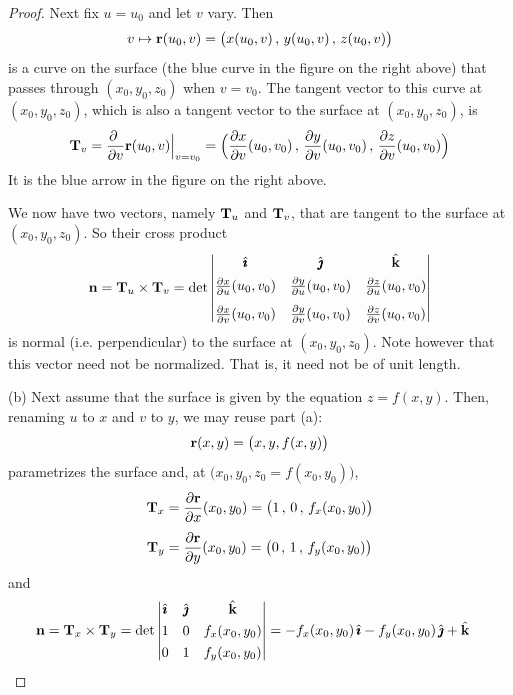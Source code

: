 \begin{proof}
Next fix $u=u_0$ and let $v$ vary. Then
\begin{equation*}
v\mapsto \mathbf{r}(u_0,v) = \big(x(u_0,v)\,,\,y(u_0,v)\,,\,z(u_0,v)\big)
\end{equation*}
is a curve on the surface (the blue curve in the figure on the right above) 
that passes through $(x_0,y_0,z_0)$ when $v=v_0$.
The tangent vector to this curve at  $(x_0,y_0,z_0)$,
which is also a tangent vector to the surface at $(x_0,y_0,z_0)$,
is
\begin{equation*}
\mathbf{T}_v = \frac{\partial\ }{\partial v}\mathbf{r}(u_0,v)\Big|_{v=v_0}
=\Big(\frac{\partial x}{\partial v}(u_0,v_0)\,,\,
      \frac{\partial y}{\partial v}(u_0,v_0)\,,\,
      \frac{\partial z}{\partial v}(u_0,v_0)\Big)
\end{equation*}
It is the blue arrow in the figure on the right above.

We now have two vectors, namely $\mathbf{T}_u$ and $\mathbf{T}_v$, that are tangent
to the surface at $(x_0,y_0,z_0)$. So their cross product
\begin{align*}
\mathbf{n} = \mathbf{T}_u\times\mathbf{T}_v
=\det\left|\begin{matrix}
            \hat{\pmb{\imath}} &  \hat{\pmb{\jmath}} & \hat{\mathbf{k}} \\[0.05in]
            \frac{\partial x}{\partial u}(u_0,v_0) &
                     \frac{\partial y}{\partial u}(u_0,v_0) &
                     \frac{\partial z}{\partial u}(u_0,v_0) \\[0.1in]
           \frac{\partial x}{\partial v}(u_0,v_0) &
                     \frac{\partial y}{\partial v}(u_0,v_0) &
                     \frac{\partial z}{\partial v}(u_0,v_0)
           \end{matrix}\right|
\end{align*}
is normal (i.e. perpendicular) to the surface at $(x_0,y_0,z_0)$.
Note however that this vector need not be normalized. That is, it need not 
be of unit length.

\bigskip
\noindent (b)
Next assume that the surface is given by the equation
$z=f(x,y)$. Then, renaming $u$ to $x$ and $v$ to $y$, we may reuse part (a):
\begin{equation*}
\mathbf{r}(x,y) = \big(x,y, f(x,y)\big)
\end{equation*}
parametrizes the surface and, at $\big(x_0,y_0,z_0=f(x_0,y_0)\big)$,
\begin{align*}
\mathbf{T}_x &= \frac{\partial\mathbf{r} }{\partial x}(x_0,y_0)
=\big(1\,,\,
      0\,,\,
      f_x(x_0,y_0)\big)
\\[0.05in]
\mathbf{T}_y &= \frac{\partial\mathbf{r} }{\partial y}(x_0,y_0)
=\big(0\,,\,
      1\,,\,
      f_y(x_0,y_0)\big)
\end{align*}
and
\begin{align*}
\mathbf{n} &= \mathbf{T}_x\times\mathbf{T}_y
=\det\left|\begin{matrix}
            \hat{\pmb{\imath}} &  \hat{\pmb{\jmath}} & \hat{\mathbf{k}} \\[0.05in]
            1 & 0 & f_x(x_0,y_0) \\[0.05in]
            0 & 1 & f_y(x_0,y_0)
           \end{matrix}\right|
=-f_x(x_0,y_0)\,\hat{\pmb{\imath}} - f_y(x_0,y_0)\,\hat{\pmb{\jmath}} + \hat{\mathbf{k}}
\end{align*}


\end{proof}
